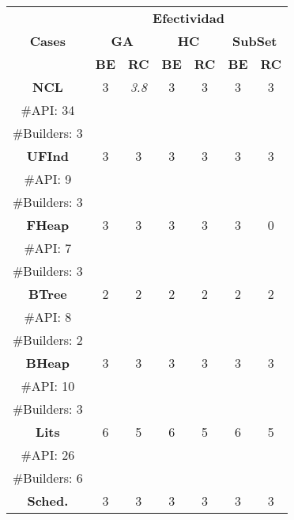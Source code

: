 \begin{table}[H]
\centering
\label{tab:t1}
\scriptsize
\begin{tabular}{c ccccccc}
\midrule
\multicolumn{2}{c}{\multirow{3}{*}{\textbf{Cases}}} & \multicolumn{6}{c}{\textbf{Efectividad}} \\
\cline{3-8}
\multicolumn{2}{c}{} & \multicolumn{2}{c}{\textbf{GA}} & \multicolumn{2}{c}{\textbf{HC}} & \multicolumn{2}{c}{\textbf{SubSet}} \\
\multicolumn{2}{c}{} & \textbf{\tiny{BE}} & \textbf{\tiny{RC}} & \textbf{\tiny{BE}} & \textbf{\tiny{RC}} & \textbf{\tiny{BE}} & \textbf{\tiny{RC}} \\
\midrule
\multicolumn{2}{c}{\textbf{NCL}} & 3  &   \cellcolor{gray!25} \emph{3.8} & 3 &  3 &3 &  3 \\
\multicolumn{2}{c}{\tiny \#API: 34} &  &   & &   & & \\
\multicolumn{2}{c}{\tiny \#Builders: 3} &  &   & &   & & \\

\midrule
\multicolumn{2}{c}{\textbf{UFInd}}& 3 & 3  & 3  & 3  &3   & 3     \\
\multicolumn{2}{c}{\tiny \#API: 9} &  &   & &   & & \\
\multicolumn{2}{c}{\tiny \#Builders: 3} &  &   & &   & & \\
\midrule

\multicolumn{2}{c}{\textbf{FHeap}}& 3 & 3  &  3 &  3 &  3 &  0   \\
\multicolumn{2}{c}{\tiny \#API: 7} &  &   & &   & & \\
\multicolumn{2}{c}{\tiny \#Builders: 3} &  &   & &   & & \\
\midrule
\multicolumn{2}{c}{\textbf{BTree}} & 2 & 2  &  2 &  2 &  2 &  2  \\
\multicolumn{2}{c}{\tiny \#API: 8} &  &   & &   & & \\
\multicolumn{2}{c}{\tiny \#Builders: 2} &  &   & &   & & \\
\midrule
\multicolumn{2}{c}{\textbf{BHeap}}& 3 & 3 &  3 &  3 &  3 &  3   \\
\multicolumn{2}{c}{\tiny \#API: 10} &  &   & &   & & \\
\multicolumn{2}{c}{\tiny \#Builders: 3} &  &   & &   & & \\
\midrule
\multicolumn{2}{c}{\textbf{Lits}} &  6 & 5 & 6 &  5  & 6  &5   \\
\multicolumn{2}{c}{\tiny \#API: 26} &  &   & &   & & \\
\multicolumn{2}{c}{\tiny \#Builders: 6} &  &   & &   & & \\
\midrule
\multicolumn{2}{c}{\textbf{Sched.}} &  3 & 3   & 3  &  3&  3 & 3 \\


\end{tabular}
\end{table}
